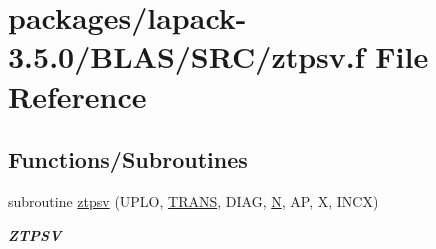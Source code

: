 \hypertarget{lapack-3_85_80_2BLAS_2SRC_2ztpsv_8f}{}\section{packages/lapack-\/3.5.0/\+B\+L\+A\+S/\+S\+R\+C/ztpsv.f File Reference}
\label{lapack-3_85_80_2BLAS_2SRC_2ztpsv_8f}
\subsection*{Functions/\+Subroutines}
\begin{DoxyCompactItemize}
\item 
subroutine \hyperlink{group__complex16__blas__level2_ga8e2b6e006861da3d455817cf928d9972}{ztpsv} (U\+P\+L\+O, \hyperlink{superlu__enum__consts_8h_a0c4e17b2d5cea33f9991ccc6a6678d62a1f61e3015bfe0f0c2c3fda4c5a0cdf58}{T\+R\+A\+N\+S}, D\+I\+A\+G, \hyperlink{polmisc_8c_a0240ac851181b84ac374872dc5434ee4}{N}, A\+P, X, I\+N\+C\+X)
\begin{DoxyCompactList}\small\item\em {\bfseries Z\+T\+P\+S\+V} \end{DoxyCompactList}\end{DoxyCompactItemize}
